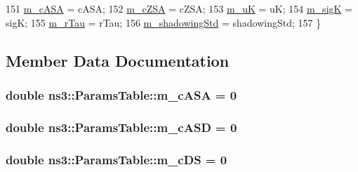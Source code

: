 \begin{DoxyCode}
151                 \hyperlink{structns3_1_1ParamsTable_aad00f3c11dec9ab5b6d5e670926afe32}{m\_cASA} = cASA;
152                 \hyperlink{structns3_1_1ParamsTable_ada95141c686afebded23cac862264192}{m\_cZSA} = cZSA;
153                 \hyperlink{structns3_1_1ParamsTable_a502aa4c04fa836a83ff192ad311641f8}{m\_uK} = uK;
154                 \hyperlink{structns3_1_1ParamsTable_af1bc3a5dae9dfa58212710b4da537575}{m\_sigK} = sigK;
155                 \hyperlink{structns3_1_1ParamsTable_a52bfef28de9043c94f0d471fb69547ff}{m\_rTau} = rTau;
156                 \hyperlink{structns3_1_1ParamsTable_a78200aa25c09c9f50795c7c87d47ab8d}{m\_shadowingStd} = shadowingStd;
157         \}
\end{DoxyCode}


\subsection{Member Data Documentation}
\subsubsection[{\texorpdfstring{m\+\_\+c\+A\+SA}{m_cASA}}]{\setlength{\rightskip}{0pt plus 5cm}double ns3\+::\+Params\+Table\+::m\+\_\+c\+A\+SA = 0}\hypertarget{structns3_1_1ParamsTable_aad00f3c11dec9ab5b6d5e670926afe32}{}\label{structns3_1_1ParamsTable_aad00f3c11dec9ab5b6d5e670926afe32}
\subsubsection[{\texorpdfstring{m\+\_\+c\+A\+SD}{m_cASD}}]{\setlength{\rightskip}{0pt plus 5cm}double ns3\+::\+Params\+Table\+::m\+\_\+c\+A\+SD = 0}\hypertarget{structns3_1_1ParamsTable_a0f9954987c6a0999ee1d95ec016a80dc}{}\label{structns3_1_1ParamsTable_a0f9954987c6a0999ee1d95ec016a80dc}
\subsubsection[{\texorpdfstring{m\+\_\+c\+DS}{m_cDS}}]{\setlength{\rightskip}{0pt plus 5cm}double ns3\+::\+Params\+Table\+::m\+\_\+c\+DS = 0}\hypertarget{structns3_1_1ParamsTable_afaf471e810a6d0b40dba8d682eae6f41}{}\label{structns3_1_1ParamsTable_afaf471e810a6d0b40dba8d682eae6f41}
